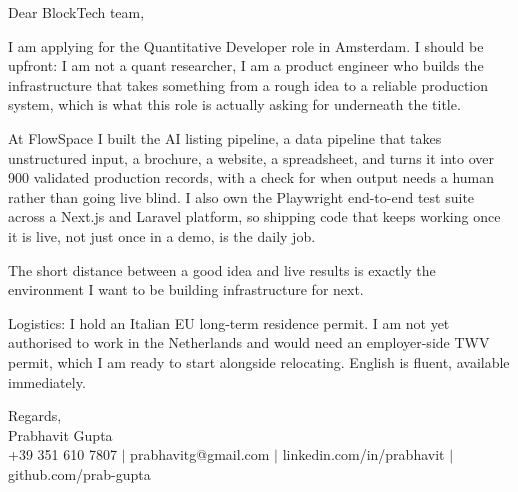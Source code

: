 \documentclass[a4paper,11pt]{article}
\begin{document}
Dear BlockTech team,

I am applying for the Quantitative Developer role in Amsterdam. I should be upfront: I am not a quant researcher, I am a product engineer who builds the infrastructure that takes something from a rough idea to a reliable production system, which is what this role is actually asking for underneath the title.

At FlowSpace I built the AI listing pipeline, a data pipeline that takes unstructured input, a brochure, a website, a spreadsheet, and turns it into over 900 validated production records, with a check for when output needs a human rather than going live blind. I also own the Playwright end-to-end test suite across a Next.js and Laravel platform, so shipping code that keeps working once it is live, not just once in a demo, is the daily job.

The short distance between a good idea and live results is exactly the environment I want to be building infrastructure for next.

Logistics: I hold an Italian EU long-term residence permit. I am not yet authorised to work in the Netherlands and would need an employer-side TWV permit, which I am ready to start alongside relocating. English is fluent, available immediately.

Regards,\\
Prabhavit Gupta\\
+39 351 610 7807 $\vert$ prabhavitg@gmail.com $\vert$ linkedin.com/in/prabhavit $\vert$ github.com/prab-gupta
\end{document}
